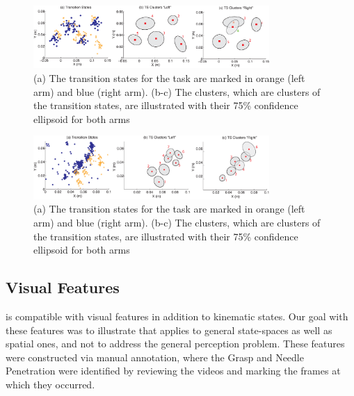\begin{figure}[t]
\centering
    \includegraphics[width=0.8\textwidth]{tsc-experiments/new_needle_passing2.eps}
    \vspace{-0.7em}
    \caption{(a) The transition states for the task are marked in orange (left arm) and blue (right arm). (b-c) The \tsc clusters, which are clusters of the transition states, are illustrated with their 75\% confidence ellipsoid for both arms}
    \label{exp:np}
    \vspace{-0.5em}
\end{figure}

\begin{figure}[t]
\centering
    \includegraphics[width=0.8\textwidth]{tsc-experiments/new_suturing2.eps}
    \vspace{-0.7em}
    \caption{ (a) The transition states for the task are marked in orange (left arm) and blue (right arm). (b-c) The clusters, which are clusters of the transition states, are illustrated with their 75\% confidence ellipsoid for both arms}
    \label{exp:su}
\end{figure}

\iffalse
\subsection{Visual Features}\label{cvh}
\tsc is compatible with visual features in addition to kinematic states.
Our goal with these features was to illustrate that \tsc applies to general state-spaces as well as spatial ones, and not to address the general perception problem.
These features were constructed via manual annotation, where the Grasp and Needle Penetration were identified by reviewing the videos and marking the frames at which they occurred.

